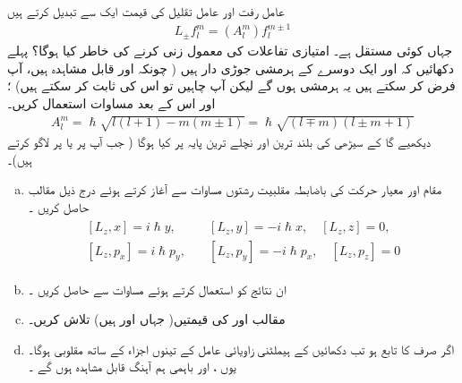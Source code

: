 عامل رفت اور عامل تقلیل  کی قیمت ایک  سے تبدیل کرتے ہیں 
\begin{align}\label{مساوات_تین_ابعاد_عامل_تقلیل_رفعت_اکائی_تبدیلی}
L_{\pm} f_l^m = (A_l^m) f_l^{m \pm 1}
\end{align}
جہاں  کوئی مستقل ہے۔  امتیازی تفاعلات کی معمول زنی کرنے  کی خاطر  کیا ہوگا؟   پہلے دکھائیں کہ  اور  ایک دوسرے کے ہرمشی جوڑی دار ہیں ( چونکہ  اور  قابل مشاہدہ  ہیں،  آپ فرض کر سکتے ہیں یہ ہرمشی ہوں گے لیکن آپ چاہیں تو اس کی ثابت کر سکتے ہیں) ؛ اور   اس کے بعد مساوات    استعمال کریں۔  
\begin{align}\label{مساوات_تین_ابعادی_اے_ایل_ایم}
A_l^m = \hslash \sqrt{l (l +1) - m (m \pm 1)} = \hslash \sqrt{(l \mp m)(l \pm m + 1)} 
\end{align}
دیکھیے گا کے سیڑھی کی بلند ترین اور نچلے ترین پایہ پر کیا ہوگا ( جب آپ  پر  یا  پر  لاگو کرتے ہیں)۔ 
\begin{enumerate}[a.]
\item
مقام اور معیار حرکت کی باضابطہ  مقلبیت رشتوں   مساوات    سے آغاز  کرتے ہوئے درج ذیل مقالب  حاصل کریں ۔
\begin{gather}
\begin{aligned}
[L_z , x] = i \hslash y, & \quad [L_z , y] = - i \hslash x, \quad  [L_z , z] = 0, \\
 [L_z , p_x] = i \hslash p_y ,   &\quad [L_z , p_y] = - i \hslash p_x , \quad [L_z , p_z] = 0
\end{aligned}
\end{gather}
\item
ان نتائج کو استعمال کرتے ہوئے مساوات    سے   حاصل کریں ۔
\item
مقالب   اور  کی قیمتیں( جہاں  اور  ہیں)  تلاش کریں۔
\item
اگر  صرف  کا تابع ہو تب دکھائیں کے ہیملٹنی  زاویائی عامل   کے  تینوں اجزاء کے ساتھ مقلوبی  ہوگا۔ یوں ،   اور  باہمی ہم آہنگ  قابل مشاہدہ  ہوں گے ۔
\end{enumerate}
